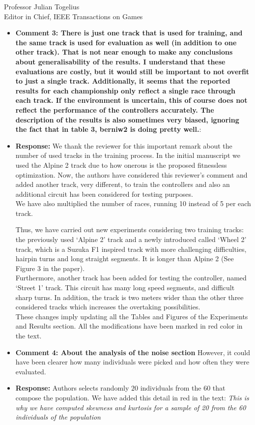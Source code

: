 \documentclass[10pt]{letter} %
\begin{document}
\begin{letter}{Professor Julian Togelius \\ Editor in Chief, IEEE Transactions on Games}
\begin{enumerate}
\begin{itemize}
		\item {\bf  Comment 3:	There is just one track that is used for training, and the same track is used for evaluation as well (in addition to one other track). That is not near enough to make any conclusions about generalisability of the results. I understand that these evaluations are costly, but it would still be important to not overfit to just a single track. Additionally, it seems that the reported results for each championship only reflect a single race through each track. If the environment is uncertain, this of course does not reflect the performance of the controllers accurately. The description of the results is also sometimes very biased, ignoring the fact that in table 3, berniw2 is doing pretty well.}:
		\item {\bf Response:}
		We thank the reviewer for this important remark about the number of used tracks in the training process. In the initial manuscript we used the Alpine 2 track due to how onerous is the proposed fitnessless optimization. 
		Now, the authors have considered this reviewer's comment and added another track, very different, to train the controllers and also an additional circuit has been considered for testing purposes.\\
		We have also multiplied the number of races, running 10 instead of 5 per each track.

		Thus, we have carried out new experiments considering two training tracks: the previously used `Alpine 2' track and a newly introduced called `Wheel 2' track, which is a Suzuka F1 inspired track with more challenging difficulties, hairpin turns and long straight segments. It is longer than Alpine 2 (See Figure 3 in the paper).\\
		Furthermore, another track has been added for testing the controller, named `Street 1' track. This circuit has many long speed segments, and difficult sharp turns. In addition, the track is two meters wider than the other three considered tracks which increases the overtaking possibilities.\\
		These changes imply updating all the Tables and Figures of the Experiments and Results section. All the modifications have been marked in red color in the text.\\
		
		 
		\item {\bf   Comment 4:	About the analysis of the noise section} However, it could have been clearer how many individuals were picked and how often they were evaluated.
		\item {\bf Response:}
		Authors selects randomly $20$ individuals from the $60$ that compose the population.
		We have added this detail in red in the text:
		{\em This is why we have computed skewness and kurtosis for a sample of 20 from the 60 individuals of the population}\\	


\end{itemize}
\end{enumerate}
\end{letter}
\end{document}
